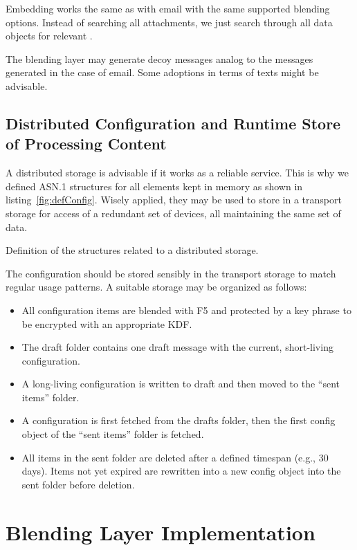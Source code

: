 Embedding works the same as with email with the same supported blending options. Instead of searching all attachments, we just search through all data objects for relevant \VortexMessages.

The blending layer may generate decoy messages analog to the messages generated in the case of email. Some adoptions in terms of texts might be advisable.

\section{Distributed Configuration and Runtime Store of Processing Content}
A distributed storage is advisable if it works as a reliable service. This is why we defined ASN.1 structures for all elements kept in memory as shown in listing~\ref{fig:defConfig}. Wisely applied, they may be used to store in a transport storage for access of a redundant set of devices, all maintaining the same set of data. 

\begin{lstfloat}[ht]
	
	\caption{Definition of the structures related to a distributed storage.}
	\label{fig:defConfig}
\end{lstfloat}

The configuration should be stored sensibly in the transport storage to match regular usage patterns. A suitable storage may be organized as follows:
\begin{itemize}
	\item All configuration items are blended with F5 and protected by a key phrase to be encrypted with an appropriate KDF.
	\item The draft folder contains one draft message with the current, short-living configuration. 
	\item A long-living configuration is written to draft and then moved to the ``sent items'' folder.
	\item A configuration is first fetched from the drafts folder, then the first config object of the ``sent items'' folder is fetched.
	\item All items in the sent folder are deleted after a defined timespan (e.g., 30 days). Items not yet expired are rewritten into a new config object into the sent folder before deletion. 
\end{itemize}


\chapter{Blending Layer Implementation}\label{sec:blendingImplementation}
